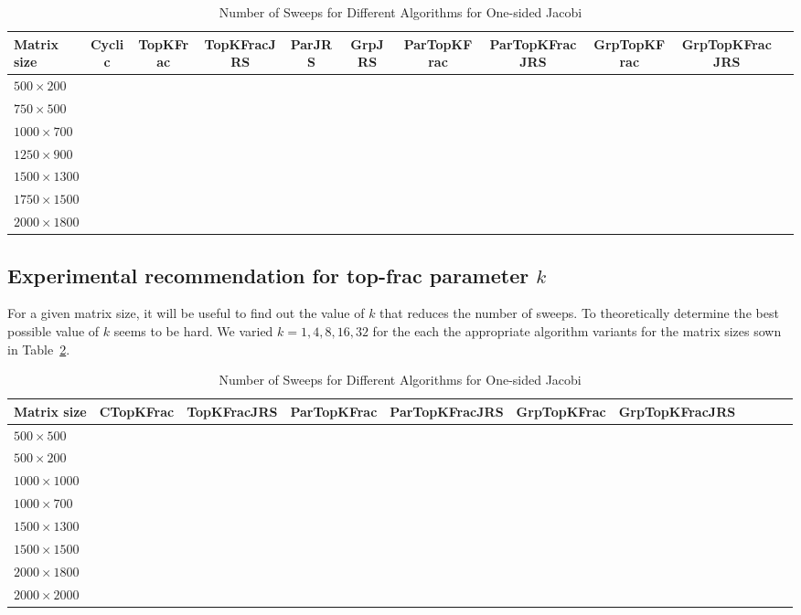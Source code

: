 \documentclass[10pt, conference, compsocconf]{IEEEtran}
\begin{document}
\begin{table}
  \centering
  \caption{Number of Sweeps for Different Algorithms for One-sided Jacobi}
  \label{tab:onesided}
  \begin{tabular}{lcccccccccc}
    \toprule
    Matrix size & Cyclic & TopKFrac & TopKFracJRS & ParJRS & GrpJRS & ParTopKFrac & ParTopKFracJRS & GrpTopKFrac & GrpTopKFracJRS \\
    \midrule
    $500 \times 200$   &  \\
    $750 \times 500$   &  \\
    $1000 \times 700$  &  \\
    $1250 \times 900$  &  \\
    $1500 \times 1300$ &  \\
    $1750 \times 1500$ &  \\
    $2000 \times 1800$ &  \\
    \bottomrule
  \end{tabular}
\end{table}

\subsection{Experimental recommendation for top-frac parameter $k$}

For a given matrix size, it will be useful to find out the value of $k$ that reduces the number of sweeps. To theoretically determine the best possible value of $k$ seems to be hard. We varied $k=1,4,8,16,32$ for the each the appropriate algorithm variants for the matrix sizes sown in Table~\ref{tab:varyk}.

\begin{table}
  \centering
  \caption{Number of Sweeps for Different Algorithms for One-sided Jacobi}
  \label{tab:varyk}
  \begin{tabular}{lcccccccccc}
    \toprule
    Matrix size & CTopKFrac & TopKFracJRS & ParTopKFrac & ParTopKFracJRS & GrpTopKFrac & GrpTopKFracJRS \\
    \midrule
    $500 \times 500$   &  \\
    $500 \times 200$   &  \\
    $1000 \times 1000$ &  \\
    $1000 \times 700$  &  \\
    $1500 \times 1300$ &  \\
    $1500 \times 1500$ &  \\
    $2000 \times 1800$ &  \\
    $2000 \times 2000$ &  \\
    \bottomrule
  \end{tabular}
\end{table}
\end{document}
